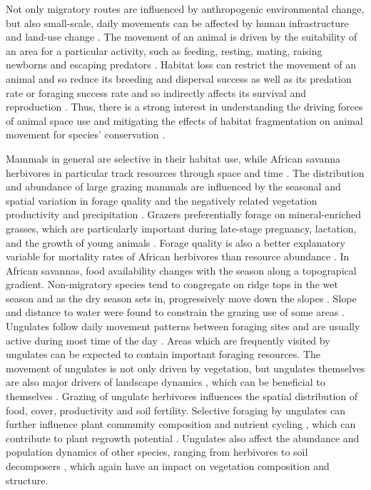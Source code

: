 \documentclass[12pt,a4paper, twoside, english]{article}
\begin{document}
Not only migratory routes are influenced by anthropogenic environmental change, but also small-scale, daily movements can be affected by human infrastructure and land-use change \citep{Panzacchi2016}. The movement of an animal is driven by the suitability of an area for a particular activity, such as feeding, resting, mating, raising newborns and escaping predators \citep{Panzacchi2016}. Habitat loss can restrict the movement of an animal and so reduce its breeding and dispersal success as well as its predation rate or foraging success rate \citep{Fahrig2003} and so indirectly affects its survival and reproduction \citep{VandeKerk2015}. Thus, there is a strong interest in understanding the driving forces of animal space use and mitigating the effects of habitat fragmentation on animal movement for species' conservation \citep{Sundaresan2008, Panzacchi2016}. 

Mammals in general are selective in their habitat use, while African savanna herbivores in particular track resources through space and time \citep{Bailey1996a}. The distribution and abundance of large grazing mammals are influenced by the seasonal and spatial variation in forage quality and the negatively related vegetation productivity and precipitation \citep{McNaughton1983, McNaughton1985, Breman1983}. Grazers preferentially forage on mineral-enriched grasses, which are particularly important during late-stage pregnancy, lactation, and the growth of young animals \citep{McNaughton1988, McNaughton1990}. Forage quality is also a better explanatory variable for mortality rates of African herbivores than resource abundance \citep{Fryxell1987, Sinclair1985}. In African savannas, food availability changes with the season along a topograpical gradient. Non-migratory species tend to congregate on ridge tops in the wet season and as the dry season sets in, progressively move down the slopes \citep{Jarman1979}. Slope and distance to water were found to constrain the grazing use of some areas \citep{Bailey1996a}. Ungulates follow daily movement patterns between foraging sites and are usually active during most time of the day \citep{Schweiger2015}. Areas which are frequently visited by ungulates can be expected to contain important foraging resources. The movement of ungulates is not only driven by vegetation, but ungulates themselves are also major drivers of landscape dynamics \citep{McNaughton1979, McNaughton1997, DeKnegt2008, DeJager2009}, which can be beneficial to themselves \citep{Jones1994}. Grazing of ungulate herbivores influences the spatial distribution of food, cover, productivity and soil fertility. Selective foraging by ungulates can further influence plant community composition and nutrient cycling \citep{DeJager2009}, which can contribute to plant regrowth potential \citep{McNaughton1983, Coughenour1985}. Ungulates also affect the abundance and population dynamics of other species, ranging from herbivores \citep{Coughenour1991} to soil decomposers \citep{Wardle2004}, which again have an impact on vegetation composition and structure.
\end{document}
